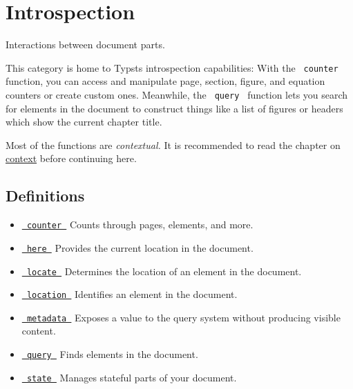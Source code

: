 \section{Introspection}\label{summary}

Interactions between document parts.

This category is home to Typst\textquotesingle s introspection
capabilities: With the \texttt{\ counter\ } function, you can access and
manipulate page, section, figure, and equation counters or create custom
ones. Meanwhile, the \texttt{\ query\ } function lets you search for
elements in the document to construct things like a list of figures or
headers which show the current chapter title.

Most of the functions are \emph{contextual.} It is recommended to read
the chapter on \href{/docs/reference/context/}{context} before
continuing here.

\subsection{Definitions}\label{definitions}

\begin{itemize}
\tightlist
\item
  \href{/docs/reference/introspection/counter/}{\texttt{\ counter\ }} {
  Counts through pages, elements, and more. }
\item
  \href{/docs/reference/introspection/here/}{\texttt{\ here\ }} {
  Provides the current location in the document. }
\item
  \href{/docs/reference/introspection/locate/}{\texttt{\ locate\ }} {
  Determines the location of an element in the document. }
\item
  \href{/docs/reference/introspection/location/}{\texttt{\ location\ }}
  { Identifies an element in the document. }
\item
  \href{/docs/reference/introspection/metadata/}{\texttt{\ metadata\ }}
  { Exposes a value to the query system without producing visible
  content. }
\item
  \href{/docs/reference/introspection/query/}{\texttt{\ query\ }} {
  Finds elements in the document. }
\item
  \href{/docs/reference/introspection/state/}{\texttt{\ state\ }} {
  Manages stateful parts of your document. }
\end{itemize}

\href{/docs/reference/visualize/stroke/}{\pandocbounded{}}

